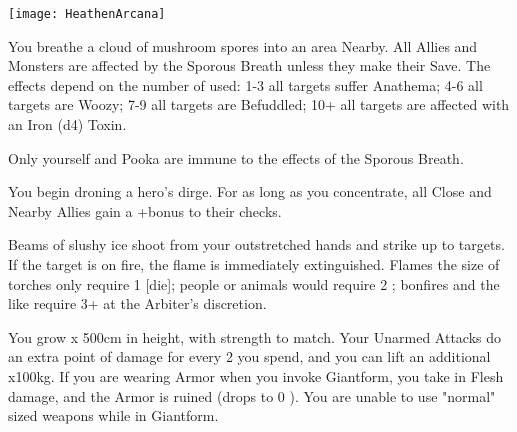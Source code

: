 {  \begin{center}
  \texttt{[image: HeathenArcana]}
  \end{center}



\MYSTERY [
  Name = Sporous Breath,
  Link = arcana-mystery-sporous-breath,
  Paradigm = Biomancy,
  Save = Y (neg.),
  Duration = Combat or \SUM Minutes,
  Target = Nearby Target(s)
]

You breathe a cloud of mushroom spores into an area Nearby.  All Allies and Monsters are affected by the Sporous Breath unless they make their Save.  The effects depend on the number of \DICE used: 1-3 all targets suffer Anathema; 4-6 all targets are Woozy; 7-9 all targets are Befuddled; 10+ all targets are affected with an Iron (d4) Toxin.

Only yourself and Pooka are immune to the effects of the Sporous Breath.

\MYSTERY [
  Name = Dirge,
  Link = arcana-mystery-dirge,
  Paradigm = Death,
  Save = n/a,
  Duration = Concentration,
  Target = Close Target(s)
]

You begin droning a hero's dirge.  For as long as you concentrate, all Close and Nearby Allies gain a +\DICE bonus to their \DEATH checks.

\MYSTERY [
  Name = Extinguish,
  Link = arcana-mystery-extinguish,
  Paradigm = Elements,
  Save = N,
  Duration = Instant,
  Target = Close or Nearby Target(s)
]

Beams of slushy ice shoot from your outstretched hands and strike up to \DICE targets.  If the target is on fire, the flame is immediately extinguished.  Flames the size of torches only require 1 [die]; people or animals would require 2 \DICE; bonfires and the like require 3+ \DICE at the Arbiter's discretion.

\MYSTERY [
  Name = Giantform,
  Link = arcana-mystery-giantform,
  Paradigm = Biomancy,
  Save = n/a,
  Duration = Combat or \SUM Minutes,
  Target = Self
]

You grow \DICE x 500cm in height, with strength to match.  Your Unarmed Attacks do an extra point of damage for every 2 \DICE you spend, and you can lift an additional \DICE x100kg.   If you are wearing Armor when you invoke Giantform, you take \MAX \UD in Flesh damage, and the Armor is ruined (drops to 0 \MAX \UD).  You are unable to use "normal" sized weapons while in Giantform.

\MYSTERY [
  Name = Incinerate,
  Link = arcana-mystery-incinerate,
  Paradigm = Elements,
  Save = N,
  Duration = See Below,
  Target = Close Target(s)
]

}
